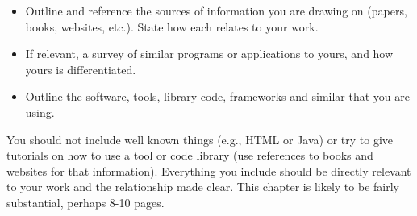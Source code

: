 \begin{itemize}
\item Outline and reference the sources of information you are drawing on
(papers, books, websites, etc.). State how each relates to your work.
\item If relevant, a survey of similar programs or applications to yours, and how yours is differentiated.
\item Outline the software, tools, library code, frameworks and similar that you are using.
\end{itemize}
You should not include well known things (e.g., HTML or Java) or try to give tutorials on how to use a tool or code library (use references to books and websites for that information). Everything you include should be directly relevant to your work and the relationship made clear. This chapter is likely to be fairly substantial, perhaps 8-10 pages.
